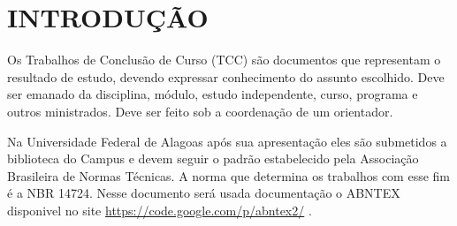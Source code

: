 %
%

\chapter{INTRODUÇÃO}\label{chap:introducao}

Os Trabalhos de Conclusão de Curso (TCC) são documentos que
representam o resultado de estudo, devendo expressar conhecimento do assunto escolhido. Deve ser emanado da disciplina, módulo, estudo independente, curso, programa e outros ministrados. Deve ser feito sob a coordenação de um orientador.

Na Universidade Federal de Alagoas após sua apresentação
eles são submetidos a biblioteca do Campus e devem seguir o padrão estabelecido pela Associação Brasileira de Normas Técnicas. A norma que determina os trabalhos com esse fim é a NBR 14724. Nesse documento será usada documentação o ABNTEX disponivel no site \href{https://code.google.com/p/abntex2/}{https://code.google.com/p/abntex2/} .

